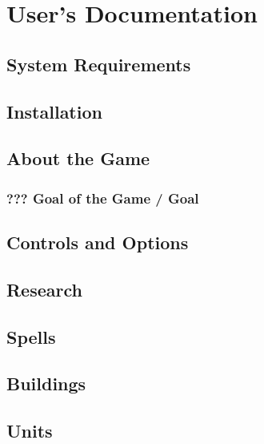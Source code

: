 \chapter{User's Documentation}

\section{System Requirements}

\section{Installation}

\section{About the Game}

\subsection{??? Goal of the Game / Goal}

\section{Controls and Options}

\section{Research}

\section{Spells}

\section{Buildings}

\section{Units}
